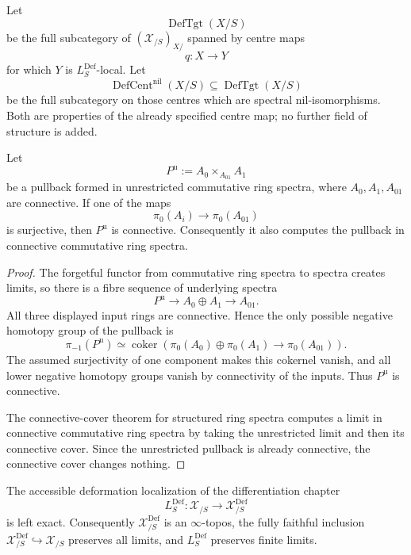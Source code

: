 \begin{definition}
\label{def:bnli-defcent-target}
Let
\[
    \operatorname{DefTgt}(X/S)
\]
be the full subcategory of $(\mathcal X_{/S})_{X/}$ spanned by centre maps
\[
    q:X\longrightarrow Y
\]
for which $Y$ is $L_S^{\mathrm{Def}}$-local.  Let
\[
    \operatorname{DefCent}^{\mathrm{nil}}(X/S)
    \subseteq
    \operatorname{DefTgt}(X/S)
\]
be the full subcategory on those centres which are spectral nil-isomorphisms.
Both are properties of the already specified centre map; no further field of
structure is added.
\end{definition}

\begin{lemma}
\label{lem:bnli-connective-pullback-recognition}
Let
\[
    P^{\mathrm{u}}:=A_0\times_{A_{01}}A_1
\]
be a pullback formed in unrestricted commutative ring spectra, where
$A_0,A_1,A_{01}$ are connective.  If one of the maps
\[
    \pi_0(A_i)\longrightarrow\pi_0(A_{01})
\]
is surjective, then $P^{\mathrm{u}}$ is connective.  Consequently it also
computes the pullback in connective commutative ring spectra.
\end{lemma}

\begin{proof}
The forgetful functor from commutative ring spectra to spectra creates limits,
so there is a fibre sequence of underlying spectra
\[
    P^{\mathrm{u}}
    \longrightarrow
    A_0\oplus A_1
    \longrightarrow
    A_{01}.
\]
All three displayed input rings are connective.  Hence the only possible
negative homotopy group of the pullback is
\[
    \pi_{-1}(P^{\mathrm{u}})
    \simeq
    \operatorname{coker}
    \left(
      \pi_0(A_0)\oplus\pi_0(A_1)
      \longrightarrow
      \pi_0(A_{01})
    \right).
\]
The assumed surjectivity of one component makes this cokernel vanish, and all
lower negative homotopy groups vanish by connectivity of the inputs.  Thus
$P^{\mathrm{u}}$ is connective.

The connective-cover theorem for structured ring spectra computes a limit in
connective commutative ring spectra by taking the unrestricted limit and then
its connective cover.  Since the unrestricted pullback is already connective,
the connective cover changes nothing.
\end{proof}

\begin{theorem}
\label{thm:bnli-def-left-exact}
The accessible deformation localization of the differentiation chapter
\[
    L_S^{\mathrm{Def}}:
    \mathcal X_{/S}\longrightarrow\mathcal X^{\mathrm{Def}}_{/S}
\]
is left exact.  Consequently $\mathcal X^{\mathrm{Def}}_{/S}$ is an
$\infty$-topos, the fully faithful inclusion
$\mathcal X^{\mathrm{Def}}_{/S}\hookrightarrow\mathcal X_{/S}$ preserves all
limits, and $L_S^{\mathrm{Def}}$ preserves finite limits.
\end{theorem}

